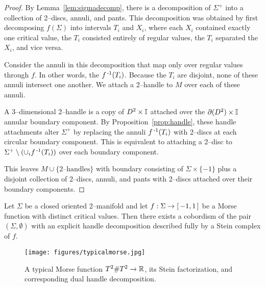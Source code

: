 \begin{proof}
	By Lemma~\ref{lem:sigmadecomp}, there is a decomposition of $\Sigma^+$ into a collection of 2--discs, annuli, and pants.
	This decomposition was obtained by first decomposing $f(\Sigma)$ into intervals $T_i$ and $X_i$, where each $X_i$ contained exactly one critical value, the $T_i$ consisted entirely of regular values, the $T_i$ separated the $X_i$, and vice versa.
	
	Consider the annuli in this decomposition that map only over regular values through $f$.
	In other words, the $f^{\,\text{-}1}(T_i)$.
	Because the $T_i$ are disjoint, none of these annuli intersect one another.
	We attach a 2--handle to $M$ over each of these annuli.
	
	A 3--dimensional 2--handle is a copy of $D^2\times\mathbb{I}$ attached over the $\partial(D^2)\times\mathbb{I}$ annular boundary component.
	By Proposition~\ref{prop:handle}, these handle attachments alter $\Sigma^+$ by replacing the annuli $f^{\,\text{-}1}(T_i)$ with 2--discs at each circular boundary component.
	This is equivalent to attaching a 2--disc to $\Sigma^+\setminus(\cup_i f^{\,\text{-}1}(T_i))$ over each boundary component.
	
	This leaves $M\cup\{\textrm{2--handles}\}$ with boundary consisting of $\Sigma\times\{-1\}$ plus a disjoint collection of 2--discs, annuli, and pants with 2--discs attached over their boundary components.	
\end{proof}

\begin{theorem}
	\label{thm:2bound3}
	Let $\Sigma$ be a closed oriented 2--manifold and let $f:\Sigma\to[\,-1,1\,]$ be a Morse function with distinct critical values.
	Then there exists a cobordism of the pair $(\Sigma,\emptyset)$ with an explicit handle decomposition described fully by a Stein complex of $f$.
\end{theorem}

\begin{figure}
	\caption{A typical Morse function $T^2\# T^2\to\mathbb{R}$, its Stein factorization, and corresponding dual handle decomposition.}
	\centering
	\texttt{[image: figures/typicalmorse.jpg]}
	\label{fig:typicalmorse}
\end{figure}

